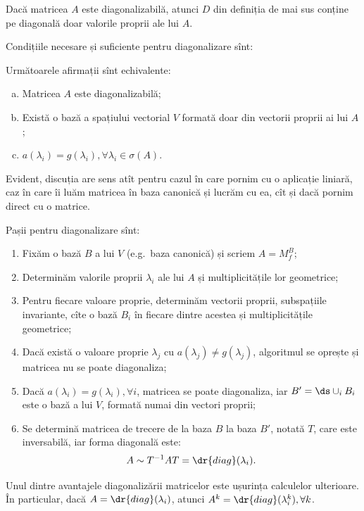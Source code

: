 \begin{remark}\label{rk:diag}
  Dacă matricea $ A $ este diagonalizabilă, atunci $ D $ din definiția de mai sus
  conține pe diagonală doar valorile proprii ale lui $ A $.
\end{remark}

Condițiile necesare și suficiente pentru diagonalizare sînt:
\begin{theorem}\label{thm:diag}
  Următoarele afirmații sînt echivalente:
  \begin{enumerate}[(a)]
  \item Matricea $ A $ este diagonalizabilă;
  \item Există o bază a spațiului vectorial $ V $ formată doar din vectorii
    proprii ai lui $ A $;
  \item $ a(\lambda_i) = g(\lambda_i), \forall \lambda_i \in \sigma(A) $.
  \end{enumerate}
\end{theorem}

Evident, discuția are sens atît pentru cazul în care pornim cu o aplicație
liniară, caz în care îi luăm matricea în baza canonică și lucrăm cu ea,
cît și dacă pornim direct cu o matrice.

Pașii pentru diagonalizare sînt:
\begin{enumerate}[(1)]
\item Fixăm o bază $ B $ a lui $ V $ (e.g.\ baza canonică) și scriem $ A = M_f^B $;
\item Determinăm valorile proprii $ \lambda_i $ ale lui $ A $ și multiplicitățile
  lor geometrice;
\item Pentru fiecare valoare proprie, determinăm vectorii proprii, subspațiile
  invariante, cîte o bază $ B_i $ în fiecare dintre acestea și multiplicitățile
  geometrice;
\item Dacă există o valoare proprie $ \lambda_j $ cu $ a(\lambda_j) \neq g(\lambda_j)$,
  algoritmul se oprește și matricea nu se poate diagonaliza;
\item Dacă $ a(\lambda_i) = g(\lambda_i), \forall i $, matricea se poate
  diagonaliza, iar $ B' = \ds\cup_i B_i $ este o bază a lui $ V $, formată
  numai din vectori proprii;
\item Se determină matricea de trecere de la baza $ B $ la baza $ B' $, notată $ T $,
  care este inversabilă, iar forma diagonală este:
  \[
    A \sim T^{-1} AT = \dr{diag} (\lambda_i).
  \]
\end{enumerate}

\begin{remark}\label{rk:diag-putere}
  Unul dintre avantajele diagonalizării matricelor este ușurința calculelor
  ulterioare. În particular, dacă $ A = \dr{diag}(\lambda_i) $,
  atunci $ A^k = \dr{diag}(\lambda_i^k), \forall k $.
\end{remark}

